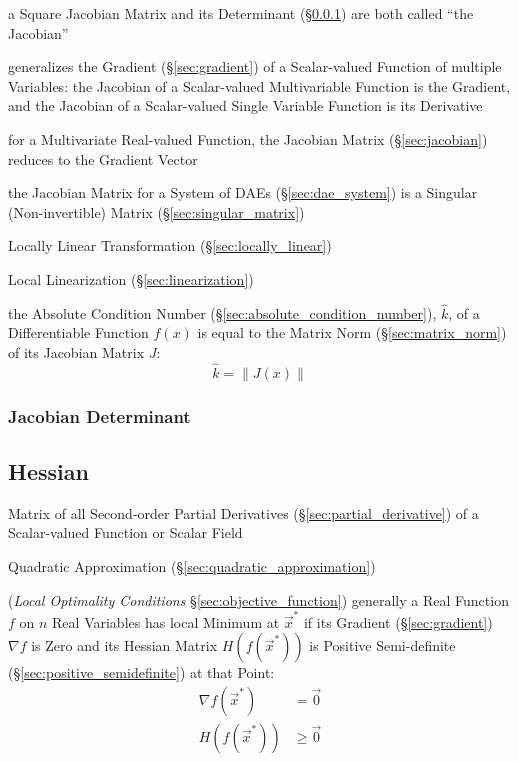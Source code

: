 a Square Jacobian Matrix and its Determinant (\S\ref{sec:jacobian_determinant})
are both called ``the Jacobian''

generalizes the Gradient (\S\ref{sec:gradient}) of a Scalar-valued Function of
multiple Variables: the Jacobian of a Scalar-valued Multivariable Function is
the Gradient, and the Jacobian of a Scalar-valued Single Variable Function is
its Derivative

for a Multivariate Real-valued Function, the Jacobian Matrix
(\S\ref{sec:jacobian}) reduces to the Gradient Vector

\fist the Jacobian Matrix for a System of DAEs (\S\ref{sec:dae_system}) is
a Singular (Non-invertible) Matrix (\S\ref{sec:singular_matrix})

\fist Locally Linear Transformation (\S\ref{sec:locally_linear})

\fist Local Linearization (\S\ref{sec:linearization})

the Absolute Condition Number (\S\ref{sec:absolute_condition_number}),
$\hat{k}$, of a Differentiable Function $f(x)$ is equal to the Matrix Norm
(\S\ref{sec:matrix_norm}) of its Jacobian Matrix $J$:
\[
  \hat{k} = \|J(x)\|
\]



\subsubsection{Jacobian Determinant}\label{sec:jacobian_determinant}



\subsection{Hessian}\label{sec:hessian}

Matrix of all Second-order Partial Derivatives (\S\ref{sec:partial_derivative})
of a Scalar-valued Function or Scalar Field

\fist Quadratic Approximation (\S\ref{sec:quadratic_approximation})

(\emph{Local Optimality Conditions} \S\ref{sec:objective_function}) generally a
Real Function $f$ on $n$ Real Variables has local Minimum at $\vec{x}^*$ if its
Gradient (\S\ref{sec:gradient}) $\nabla f$ is Zero and its Hessian Matrix
$H(f(\vec{x}^*))$ is Positive Semi-definite (\S\ref{sec:positive_semidefinite})
at that Point:
\begin{align*}
  \nabla f(\vec{x}^*) & = \vec{0}    \\
  H(f(\vec{x}^*))     & \geq \vec{0} \\
\end{align*}



